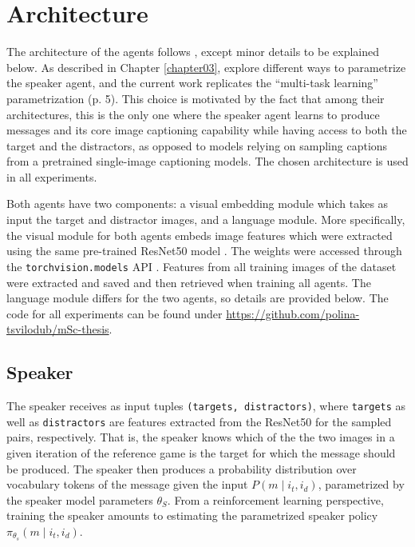 \section{Architecture}
The architecture of the agents follows \textcite{lazaridou2020multi}, except minor details to be explained below. As described in Chapter \ref{chapter03}, \textcite{lazaridou2020multi} explore different ways to parametrize the speaker agent, and the current work replicates the ``multi-task learning'' parametrization (p. 5). This choice is motivated by the fact that among their architectures, this is the only one where the speaker agent learns to produce messages and its core image captioning capability while having access to both the target and the distractors, as opposed to models relying on sampling captions from a pretrained single-image captioning models. The chosen architecture is used in all experiments.

Both agents have two components: a visual embedding module which takes as input the target and distractor images, and a language module. More specifically, the visual module for both agents embeds image features which were extracted using the same pre-trained ResNet50 model \parencite{he2016deep}. The weights were accessed through the \texttt{torchvision.models} API \parencite{marcel2010torchvision}. Features from all training images of the dataset were extracted and saved and then retrieved when training all agents. 
The language module differs for the two agents, so details are provided below. 
The code for all experiments can be found under \url{https://github.com/polina-tsvilodub/mSc-thesis}. 

\subsection{Speaker}
The speaker receives as input tuples \texttt{(targets, distractors)}, where \texttt{targets} as well as \texttt{distractors} are features extracted from the ResNet50 for the sampled pairs, respectively. That is, the speaker knows which of the the two images in a given iteration of the reference game is the target for which the message should be produced. The speaker then produces a probability distribution over vocabulary tokens of the message given the input $P(m \mid i_t, i_d)$, parametrized by the speaker model parameters $\theta_S$. From a reinforcement learning perspective, training the speaker amounts to estimating the parametrized speaker policy $\pi_{\theta_s}(m \mid i_t, i_d)$.

